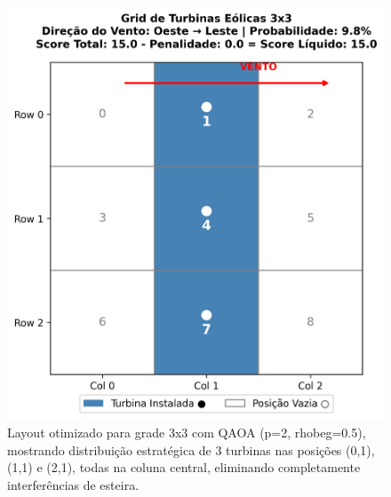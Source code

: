 \documentclass{weciq}
\begin{document}
\begin{figure}[htb]
\centering
\includegraphics[width=0.85\linewidth]{grid_visualization_temp_3x3_p2_rhobeg0.5_rep2_3x3_3turbinas_20250820_205303.png}
\caption{Layout otimizado para grade 3x3 com QAOA (p=2, rhobeg=0.5), mostrando distribuição estratégica de 3 turbinas nas posições (0,1), (1,1) e (2,1), todas na coluna central, eliminando completamente interferências de esteira.}
\end{figure}
\end{document}
